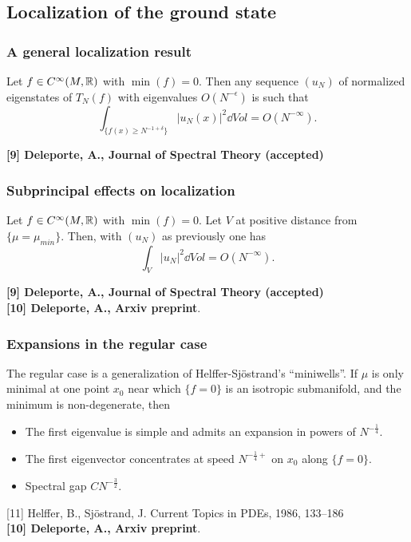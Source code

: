 \documentclass[mathserif]{beamer}
\begin{document}
\subsection{Localization of the ground state}
\begin{frame}
  \frametitle{A general localization result}
  \begin{prop}
    Let $f\in C^{\infty}(M,\mathbb{R})$ with $\min(f)=0$.
    Then any sequence $(u_N)$ of normalized eigenstates of $T_N(f)$
    with eigenvalues $O(N^{-\epsilon})$ is such that
$$\int_{\{f(x)\geq N^{-1+\delta}\}}|u_N(x)|^2 \dd Vol=O(N^{-\infty}).$$
  \end{prop}


\vspace{2em}

\small{{\bfseries [9] Deleporte, A., Journal of Spectral Theory
    (accepted)}}
\end{frame}

\begin{frame}
\frametitle{Subprincipal effects on localization}
  \begin{thm}
    Let $f\in C^{\infty}(M,\mathbb{R})$ with $\min(f)=0$. Let $V$ at positive
    distance from $\{\mu=\mu_{min}\}$.
    Then, with $(u_N)$ as previously one has $$\int_{V}|u_N|^2\dd Vol=O(N^{-\infty}).$$
  \end{thm}
\vspace{2em}

\small{{\bfseries [9] Deleporte, A., Journal of Spectral Theory
    (accepted)}\\{\bfseries [10] Deleporte, A., Arxiv preprint}.}
\end{frame}
\begin{frame}
  \frametitle{Expansions in the regular case}
  The regular case is a generalization of Helffer-Sj\"ostrand's
  ``miniwells''.
If $\mu$ is only minimal at one point $x_0$ near which $\{f=0\}$ is
    an isotropic submanifold, and the minimum is non-degenerate, then
    \begin{itemize}
    \item The first eigenvalue is simple and admits an expansion in
      powers of $N^{-\frac 14}$.
    \item The first eigenvector concentrates at speed $N^{-\frac 14+}$ on $x_0$ along
      $\{f=0\}$.
    \item Spectral gap $CN^{-\frac 32}$.
    \end{itemize}

\small{[11] Helffer, B., Sjöstrand, J. Current Topics in PDEs, 1986, 133–186\\{\bfseries [10] Deleporte, A., Arxiv preprint}.}
\end{frame}
\end{document}
